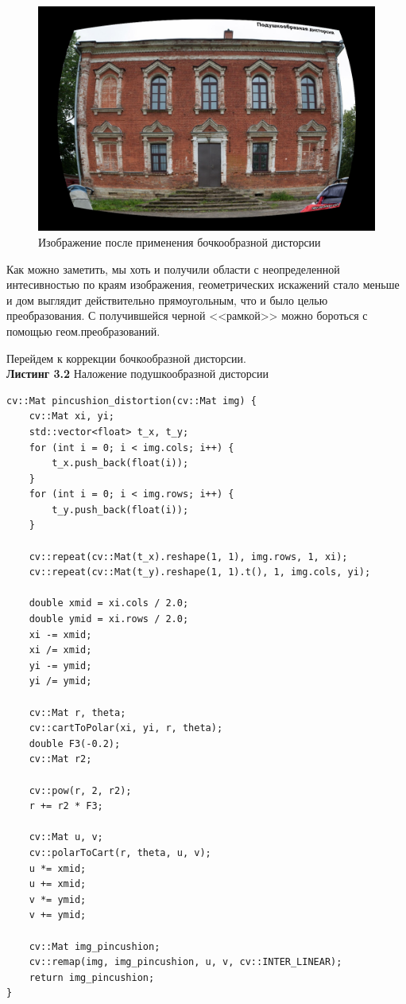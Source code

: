 \begin{figure}[h]
    \centering 
    \includegraphics[scale=0.4]{../images/results/after_bd_applied_img.jpg}
    \caption{Изображение после применения бочкообразной дисторсии}
\end{figure}
\newpage
\noindent Как можно заметить, мы хоть и получили области с неопределенной интесивностью по краям изображения, геометрических искажений стало меньше и дом выглядит действительно прямоугольным, что и было целью преобразования. С получившейся черной <<рамкой>> можно бороться с помощью геом.преобразований.

\noindent Перейдем к коррекции бочкообразной дисторсии.
\\
\noindent \textbf{Листинг 3.2} Наложение подушкообразной дисторсии
\begin{lstlisting}
cv::Mat pincushion_distortion(cv::Mat img) {
    cv::Mat xi, yi;
    std::vector<float> t_x, t_y;
    for (int i = 0; i < img.cols; i++) {
        t_x.push_back(float(i));
    } 
    for (int i = 0; i < img.rows; i++) {
        t_y.push_back(float(i));
    }

    cv::repeat(cv::Mat(t_x).reshape(1, 1), img.rows, 1, xi);
    cv::repeat(cv::Mat(t_y).reshape(1, 1).t(), 1, img.cols, yi);

    double xmid = xi.cols / 2.0;
    double ymid = xi.rows / 2.0;
    xi -= xmid;
    xi /= xmid;
    yi -= ymid;
    yi /= ymid;

    cv::Mat r, theta;
    cv::cartToPolar(xi, yi, r, theta);
    double F3(-0.2);
    cv::Mat r2;

    cv::pow(r, 2, r2);
    r += r2 * F3;

    cv::Mat u, v;
    cv::polarToCart(r, theta, u, v);
    u *= xmid;
    u += xmid;
    v *= ymid;
    v += ymid;

    cv::Mat img_pincushion;
    cv::remap(img, img_pincushion, u, v, cv::INTER_LINEAR);
    return img_pincushion;
}
\end{lstlisting}

